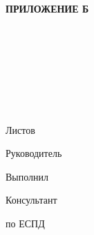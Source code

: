 \begin{ESKDtitlePage}
    \begin{flushright}
        \textbf{ПРИЛОЖЕНИЕ Б} \enspace\enspace
    \end{flushright}
    \begin{center}
        \courseworkEdu \\
        \courseworkKaf \\
    \end{center}

    \vfill

    \begin{center}
        \courseworkTopic \\
    \end{center}

    \vfill

    \begin{center}
        \textbf{\courseworkDocTopic} \\
    \end{center}

    \vfill

    \begin{center}
        \courseworkCode \\
        Листов \pageref{LastPage} \\
    \end{center}

    \vfill

    \begin{flushright}
        \begin{minipage}[t]{.49\textwidth}
            \begin{minipage}[t]{.75\textwidth}
                \begin{flushright}
                    Руководитель

                    Выполнил

                    Консультант

                    по ЕСПД
                \end{flushright}
            \end{minipage}
        \end{minipage}
        \begin{minipage}[t]{.49\textwidth}
            \begin{flushright}
                \begin{minipage}[t]{.75\textwidth}
                    \courseworkTeacherName~\courseworkTeacherSurname


\end{minipage}
\end{flushright}
\end{minipage}
\end{flushright}
\end{ESKDtitlePage}
